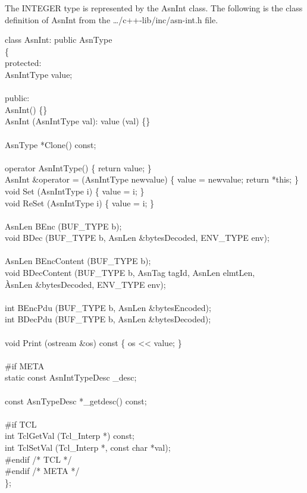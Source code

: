 The INTEGER type is represented by the {\C AsnInt} class. The
following is the class definition of {\C AsnInt} from the
{\ufn \dots/c++-lib/inc/asn-int.h} file.
\begin{Ccode}
class AsnInt: public AsnType\\
\{\\
protected:\+\\
  AsnIntType			\>\>value;\\
\\
\<public:\\
				\>\>AsnInt() \{\}\\
				\>\>AsnInt (AsnIntType val): value (val) \{\}\\
\\
  AsnType			\>\>*Clone() const;\\
\\
				\>\>operator AsnIntType() \{ return value; \}\\
  AsnInt			\>\>\&operator = (AsnIntType newvalue) \{ value = newvalue; return *this; \}
\\
  void				\>\>Set (AsnIntType i) \{ value = i; \}\\
  void				\>\>ReSet (AsnIntType i) \{ value = i; \}\\
\\
  AsnLen			\>\>BEnc (BUF\_TYPE b);\\
  void				\>\>BDec (BUF\_TYPE b, AsnLen \&bytesDecoded, ENV\_TYPE env);\\
\\
  AsnLen			\>\>BEncContent (BUF\_TYPE b);\\
  void				\>\>BDecContent (BUF\_TYPE b, AsnTag tagId, AsnLen elmtLen,\\
					\`AsnLen \&bytesDecoded, ENV\_TYPE env);\\
\\
  int				\>\>BEncPdu (BUF\_TYPE b, AsnLen \&bytesEncoded);\\
  int				\>\>BDecPdu (BUF\_TYPE b, AsnLen \&bytesDecoded);\\
\\
  void				\>\>Print (ostream \&os) const \{ os <\/< value; \}\\
\\
\<\#if META\\
  static const AsnIntTypeDesc	\>\>\_desc;\\
\\
  const AsnTypeDesc		\>\>*\_getdesc() const;\\
\\
\<\#if TCL\\
  int				\>\>TclGetVal (Tcl\_Interp *) const;\\
  int				\>\>TclSetVal (Tcl\_Interp *, const char *val);\-\\
\#endif /* TCL */\\
\#endif /* META */\\
\};
\end{Ccode}

